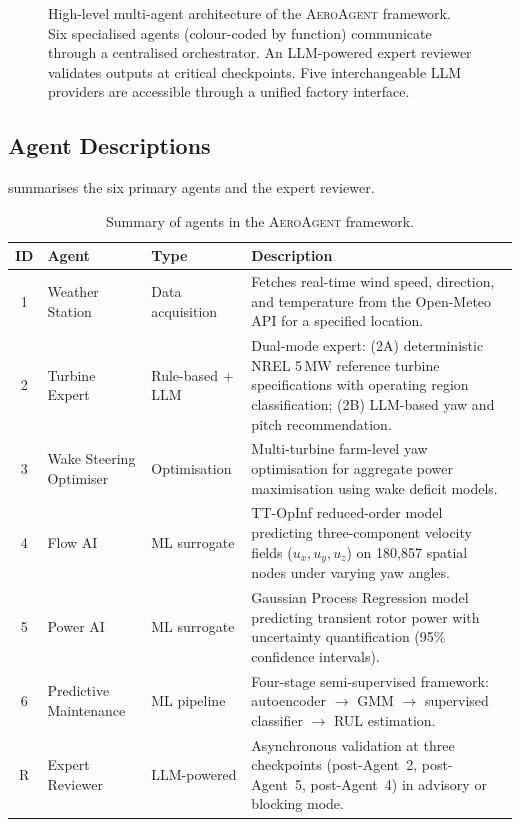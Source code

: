 \documentclass[12pt]{article}
\begin{document}
\begin{figure}[H]
{%
}%
\caption{High-level multi-agent architecture of the \textsc{AeroAgent} framework. Six specialised agents (colour-coded by function) communicate through a centralised orchestrator. An LLM-powered expert reviewer validates outputs at critical checkpoints. Five interchangeable LLM providers are accessible through a unified factory interface.}
\label{fig:architecture}
\end{figure}


\subsection{Agent Descriptions}
\label{sec:agent_descriptions}

 summarises the six primary agents and the expert reviewer.

\begin{table}[H]
\centering
\caption{Summary of agents in the \textsc{AeroAgent} framework.}
\label{tab:agents}
\small
\begin{tabularx}{\textwidth}{c l l X}
\toprule
\textbf{ID} & \textbf{Agent} & \textbf{Type} & \textbf{Description} \\
\midrule
1 & Weather Station & Data acquisition & Fetches real-time wind speed, direction, and temperature from the Open-Meteo API for a specified location. \\
2 & Turbine Expert & Rule-based + LLM & Dual-mode expert: (2A) deterministic NREL 5\,MW reference turbine specifications with operating region classification; (2B) LLM-based yaw and pitch recommendation. \\
3 & Wake Steering Optimiser & Optimisation & Multi-turbine farm-level yaw optimisation for aggregate power maximisation using wake deficit models. \\
4 & Flow AI & ML surrogate & TT-OpInf reduced-order model predicting three-component velocity fields ($u_x, u_y, u_z$) on 180{,}857 spatial nodes under varying yaw angles. \\
5 & Power AI & ML surrogate & Gaussian Process Regression model predicting transient rotor power with uncertainty quantification (95\% confidence intervals). \\
6 & Predictive Maintenance & ML pipeline & Four-stage semi-supervised framework: autoencoder $\to$ GMM $\to$ supervised classifier $\to$ RUL estimation. \\
\midrule
R & Expert Reviewer & LLM-powered & Asynchronous validation at three checkpoints (post-Agent~2, post-Agent~5, post-Agent~4) in advisory or blocking mode. \\
\bottomrule
\end{tabularx}
\end{table}
\end{document}
